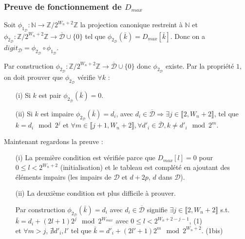 \documentclass[12pt, a4paper]{memoir}
\begin{document}
\subsubsection{Preuve de fonctionnement de \emph{$D_{max}$}}

\begin{Proposition}
 Soit $\phi_{1_\mathcal{D}} : \mathbb{N} \rightarrow \mathbb{Z} / 2^{W_n+2} \mathbb{Z}$ la projection canonique restreint à $\mathbb{N}$
 et $\phi_{2_\mathcal{D}} : \mathbb{Z} / 2^{W_n+2} \mathbb{Z} \rightarrow \overline{\mathcal{D}} \cup \{0\}$ tel que $\phi_{2_\mathcal{D}}(\bar{k}) = D_{max}[\bar{k}]$.
 Donc on a $digit_{\mathcal{D}} = \phi_{2_\mathcal{D}} \circ \phi_{1_\mathcal{D}}$.
\end{Proposition}

\begin{Preuve}
 Par construction $\phi_{2_\mathcal{D}} : \mathbb{Z} / 2^{W_n+2} \mathbb{Z} \rightarrow \overline{\mathcal{D}} \cup \{0\}$ donc $\phi_{2_\mathcal{D}}$ existe.
 Par la propriété $1$, on doit prouver que $\phi_{2_\mathcal{D}}$ vérifie $\forall k$ : \\
 \begin{itemize}
  \item [(i)] Si $k$ est pair $\phi_{2_\mathcal{D}}(\bar{k}) = 0$.
  \item [(ii)] Si $k$ est impaire $\phi_{2_\mathcal{D}}(\bar{k}) = d_i$, avec $d_i \in \overline{\mathcal{D}} 
  \Rightarrow \exists j \in \llbracket 2,W_n+2 \rrbracket$,
 tel que $k = d_i \mod 2^j$ et $\forall m \in \llbracket j+1,W_n+2 \rrbracket, \forall d'_i \in \overline{\mathcal{D}}, k \neq d'_i \mod 2^m$.
 \end{itemize}
 
 Maintenant regardons la preuve :
 \begin{itemize}
  \item [(i)] La première condition est vérifiée parce que $D_{max}[l] = 0$ pour $0 \leq l < 2^{W_n+2}$ (initialisation) et le tableau est complété en ajoutant des éléments impairs (les impairs de $\mathcal{D}$ et $d+2p$, $d$ dans $\mathcal{D}$).
  \item [(ii)] La deuxième condition est plus difficile à prouver.
  
  Par construction $\phi_{2_\mathcal{D}}(\bar{k}) = d_i$ avec $d_i \in \overline{\mathcal{D}}$ signifie
  $\exists j \in \llbracket 2,W_n+2 \rrbracket$ s.t. $\bar{k} = d_i + (2l+1)2^j \mod 2^{W_{max}}$ avec $0 \leq l < 2^{W_n+2-j-1}$, (1) \\
  et $\forall m > j$, $\nexists d'_i, l'$ tel que $\bar{k} = d'_i + (2l'+1)2^m \mod 2^{W_n+2}$. (1bis) \\
 \end{itemize}
  \vspace{0.3cm}
  

\end{Preuve}
\end{document}
